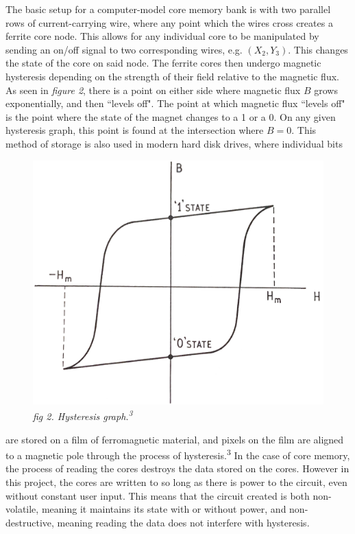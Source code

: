 \documentclass{article}
\begin{document}
\noindent The basic setup for a computer-model core memory bank is with two parallel rows of current-carrying wire, where any point which the wires cross creates a ferrite core node. This allows for any individual core to be manipulated by sending an on/off signal to two corresponding wires, e.g. $(X_2, Y_3)$. This changes the state of the core on said node. The ferrite cores then undergo magnetic hysteresis depending on the strength of their field relative to the magnetic flux. As seen in \emph{figure 2}, there is a point on either side where magnetic flux $B$ grows exponentially, and then ``levels off". The point at which magnetic flux ``levels off" is the point where the state of the magnet changes to a 1 or a 0. On any given hysteresis graph, this point is found at the intersection where $B=0$. This method of storage is also used in modern hard disk drives, where individual bits

\begin{figure}
  \includegraphics[width=\linewidth]{img/hysteresis-graph.png} 
  \caption{\small \emph{fig 2. Hysteresis graph.\textsuperscript{3}}}
\end{figure}

\noindent are stored on a film of ferromagnetic material, and pixels on the film are aligned to a magnetic pole through the process of hysteresis.\textsuperscript{3} In the case of core memory, the process of reading the cores destroys the data stored on the cores. However in this project, the cores are written to so long as there is power to the circuit, even without constant user input. This means that the circuit created is both non-volatile, meaning it maintains its state with or without power, and non-destructive, meaning reading the data does not interfere with hysteresis.
\end{document}
